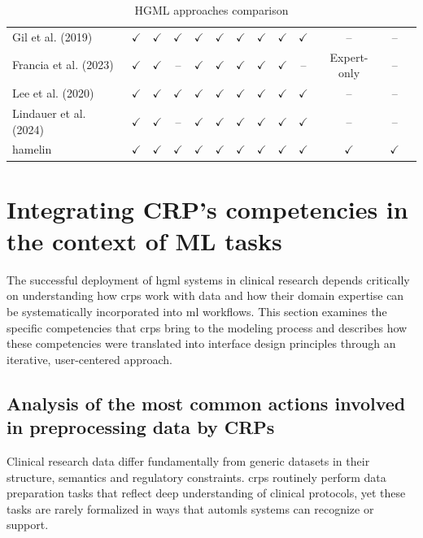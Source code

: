 \documentclass[twoside,final]{Contexto}
\begin{document}
\begin{table}[h]
{\begin{tabular}{lcccccccccccc}
\midrule
Gil et al. (2019) & $\checkmark$ & $\checkmark$ & $\checkmark$ & $\checkmark$ & $\checkmark$ & $\checkmark$ & $\checkmark$ & $\checkmark$ & $\checkmark$ & -- & -- \\ 
Francia et al. (2023) & $\checkmark$ & $\checkmark$ & -- & $\checkmark$ & $\checkmark$ & $\checkmark$ & $\checkmark$ & $\checkmark$ & -- & Expert-only & -- \\ 
Lee et al. (2020) & $\checkmark$ & $\checkmark$ & $\checkmark$ & $\checkmark$ & $\checkmark$ & $\checkmark$ & $\checkmark$ & $\checkmark$ & $\checkmark$ & -- & -- \\ 
Lindauer et al. (2024) & $\checkmark$ & $\checkmark$ & -- & $\checkmark$ & $\checkmark$ & $\checkmark$ & $\checkmark$ & $\checkmark$ & $\checkmark$ & -- & -- \\ 
\gls{hamelin} & $\checkmark$ & $\checkmark$ & $\checkmark$ & $\checkmark$ & $\checkmark$ & $\checkmark$ & $\checkmark$ & $\checkmark$ & $\checkmark$ & $\checkmark$ & $\checkmark$ \\ 
\bottomrule
\end{tabular}%
}
\caption{HGML approaches comparison}
\label{tab:HGML_comparison}
\end{table}



\section{Integrating CRP's competencies in the context of ML tasks}
\label{sec:crp_competencies}

The successful deployment of \gls{hgml} systems in clinical research depends critically on understanding how \glspl{crp} work with data and how their domain expertise can be systematically incorporated into \gls{ml} workflows. This section examines the specific competencies that \glspl{crp} bring to the modeling process and describes how these competencies were translated into interface design principles through an iterative, user-centered approach.

\subsection{Analysis of the most common actions involved in preprocessing data by CRPs}

Clinical research data differ fundamentally from generic datasets in their structure, semantics and regulatory constraints. \glspl{crp} routinely perform data preparation tasks that reflect deep understanding of clinical protocols, yet these tasks are rarely formalized in ways that \glspl{automl} systems can recognize or support.
\end{document}
